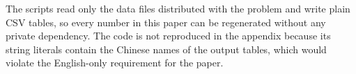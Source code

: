 The scripts read only the data files distributed with the problem and write plain CSV tables, so
every number in this paper can be regenerated without any private dependency. The code is not
reproduced in the appendix because its string literals contain the Chinese names of the output
tables, which would violate the English-only requirement for the paper.

